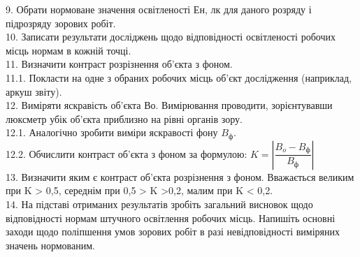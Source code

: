 \documentclass[a4paper,14pt]{extreport}
\begin{document}
9. Обрати нормоване значення освітленості Ен, лк для даного розряду і підрозряду зорових робіт.\\

10. Записати результати досліджень щодо відповідності освітленості робочих місць нормам в кожній точці.\\

11. Визначити контраст розрізнення об’єкта з фоном.\\

11.1. Покласти на одне з обраних робочих місць об’єкт дослідження (наприклад, аркуш
звіту).\\

12.  Виміряти яскравість об’єкта Во. Вимірювання проводити, зорієнтувавши люксметр убік об’єкта приблизно на рівні органів зору.\\

12.1. Аналогічно зробити виміри яскравості фону $B_{\text{ф}}$.\\

12.2. Обчислити контраст об’єкта з фоном за формулою: $K = \left|\dfrac{B_o-B_{\text{ф}}}{B_{\text{ф}}}\right|$\\

13.  Визначити яким є контраст об’єкта розрізнення з фоном. Вважається великим при K > 0,5, середнім при 0,5 > K >0,2, малим при K < 0,2.\\

14. На підставі отриманих результатів зробіть загальний висновок щодо відповідності нормам штучного освітлення робочих місць. Напишіть основні заходи щодо поліпшення умов зорових робіт в разі невідповідності виміряних значень нормованим.\\
\end{document}
